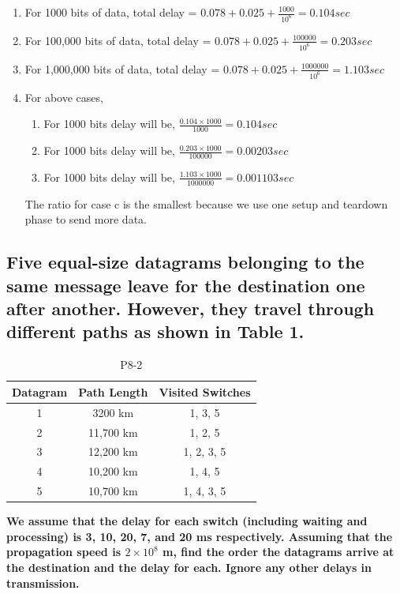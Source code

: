 \documentclass{article}
\begin{document}
\begin{enumerate}
	\item For 1000 bits of data, total delay = $ 0.078 + 0.025 + \frac{ 1000 }{ 10^6 } = 0.104 sec $
	\item For 100,000 bits of data, total delay = $ 0.078 + 0.025 + \frac{ 100000 }{ 10^6 } = 0.203 sec $
	\item For 1,000,000 bits of data, total delay = $ 0.078 + 0.025 + \frac{ 1000000 }{ 10^6 } = 1.103 sec $
	\item For above cases,
	      \begin{enumerate}
		      \item For 1000 bits delay will be, $ \frac{0.104 \times 1000}{1000} = 0.104 sec $
		      \item For 1000 bits delay will be, $ \frac{0.203 \times 1000}{100000} = 0.00203 sec $
		      \item For 1000 bits delay will be, $ \frac{1.103 \times 1000}{1000000} = 0.001103 sec $
	      \end{enumerate}
	      The ratio for case c is the smallest because we use
	      one setup and teardown phase to send more data.
\end{enumerate}


\subsection{Five equal-size datagrams belonging to the same message leave for the destination one after another. However, they travel through different paths as
	shown in Table 1.
}
\begin{table}[H]
	\centering
	\begin{tabular}{ | c | c | c | }
		\hline
		Datagram & Path Length & Visited Switches \\
		\hline
		1        & 3200 km     & 1, 3, 5          \\
		\hline
		2        & 11,700 km   & 1, 2, 5          \\
		\hline
		3        & 12,200 km   & 1, 2, 3, 5       \\
		\hline
		4        & 10,200 km   & 1, 4, 5          \\
		\hline
		5        & 10,700 km   & 1, 4, 3, 5       \\
		\hline
	\end{tabular}
	\caption{P8-2}
	\label{table:1}
\end{table}
\textbf{
	We assume that the delay for each switch (including waiting and processing)
	is 3, 10, 20, 7, and 20 ms respectively. Assuming that the propagation speed is
	$2 \times 10^8$ m, find the order the datagrams arrive at the destination and the delay
	for each. Ignore any other delays in transmission.
}
\end{document}
